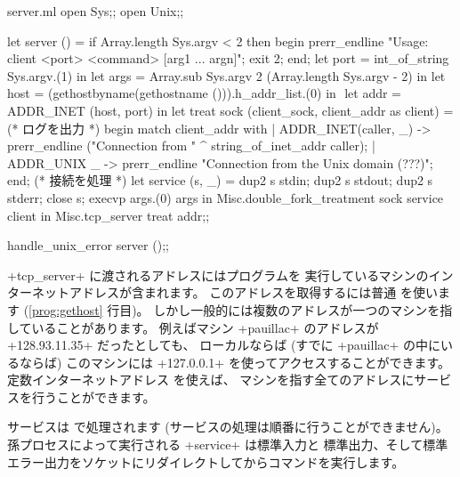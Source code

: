 %
\begin{listingcodefile}[style=numbers]{server.ml}
open Sys;;
open Unix;;

let server () =
  if Array.length Sys.argv < 2 then begin
    prerr_endline "Usage: client <port> <command> [arg1 ... argn]";
    exit 2;
  end;
  let port = int_of_string Sys.argv.(1) in
  let args = Array.sub Sys.argv 2 (Array.length Sys.argv - 2) in
  let host = (gethostbyname(gethostname ())).h_addr_list.(0) in $\label{prog:gethost}$
  let addr = ADDR_INET (host, port) in
  let treat sock (client_sock, client_addr as client) =
    (* ログを出力 *)
    begin match client_addr with
    | ADDR_INET(caller, _) ->
        prerr_endline ("Connection from " ^ string_of_inet_addr caller);
    | ADDR_UNIX _ ->
        prerr_endline "Connection from the Unix domain (???)";
    end;
    (* 接続を処理 *)
    let service (s, _) =
      dup2 s stdin; dup2 s stdout; dup2 s stderr; close s;
      execvp args.(0) args
    in
    Misc.double_fork_treatment sock service client in
  Misc.tcp_server treat addr;;

handle_unix_error server ();;
\end{listingcodefile}
%
\ml+tcp_server+ に渡されるアドレスにはプログラムを
実行しているマシンのインターネットアドレスが含まれます。
このアドレスを取得するには普通  を使います
(\ref{prog:gethost} 行目)。
しかし一般的には複数のアドレスが一つのマシンを指していることがあります。
例えばマシン \ml+pauillac+ のアドレスが \ml+128.93.11.35+ だったとしても、
ローカルならば (すでに \ml+pauillac+ の中にいるならば)
このマシンには \ml+127.0.0.1+ を使ってアクセスすることができます。
定数インターネットアドレス  を使えば、
マシンを指す全てのアドレスにサービスを行うことができます。

サービスは  で処理されます (サービスの処理は順番に行うことができません)。
孫プロセスによって実行される \ml+service+ は標準入力と
標準出力、そして標準エラー出力をソケットにリダイレクトしてからコマンドを実行します。

